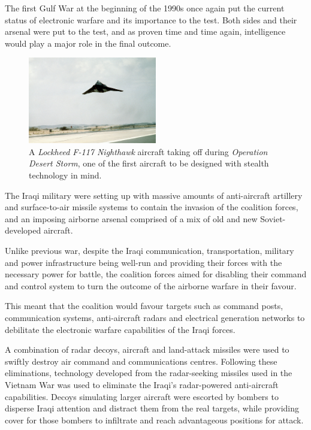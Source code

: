 \documentclass[english,purist]{ist-report}
\begin{document}
The first Gulf War at the beginning of the 1990s once again put the current status of electronic warfare and its importance to the test. Both sides and their arsenal were put to the test, and as proven time and time again, intelligence would play a major role in the final outcome.
\begin{figure}[ht]
    \centering
    \includegraphics[width = 0.5\textwidth]{f117}
    \caption{A \textit{Lockheed F-117 Nighthawk} aircraft taking off during \textit{Operation Desert Storm}, one of the first aircraft to be designed with stealth technology in mind.}
    \label{fig:gulfwar}
\end{figure}

The Iraqi military were setting up with massive amounts of anti-aircraft artillery and surface-to-air missile systems to contain the invasion of the coalition forces, and an imposing airborne arsenal comprised of a mix of old and new Soviet-developed aircraft.

Unlike previous war, despite the Iraqi communication, transportation, military and power infrastructure being well-run and providing their forces with the necessary power for battle, the coalition forces aimed for disabling their command and control system to turn the outcome of the airborne warfare in their favour.

This meant that the coalition would favour targets such as command posts, communication systems, anti-aircraft radars and electrical generation networks to debilitate the electronic warfare capabilities of the Iraqi forces.

A combination of radar decoys, \jamming{} aircraft and land-attack missiles were used to swiftly destroy air command and communications centres. Following these eliminations, technology developed from the radar-seeking missiles used in the Vietnam War was used to eliminate the Iraqi's radar-powered anti-aircraft capabilities. Decoys simulating larger aircraft were escorted by bombers to disperse Iraqi attention and distract them from the real targets, while providing cover for those bombers to infiltrate and reach advantageous positions for attack.
\end{document}
